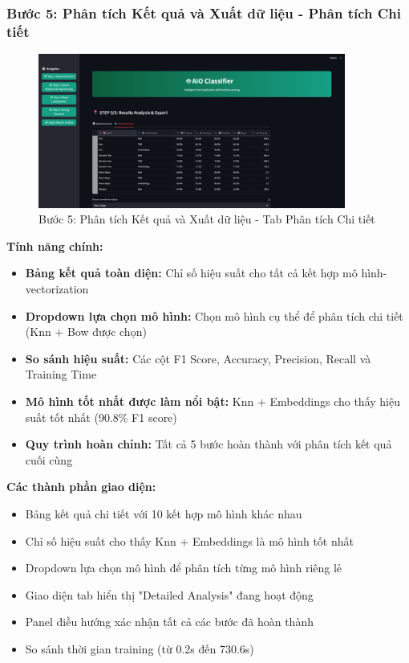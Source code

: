 \subsubsection{Bước 5: Phân tích Kết quả và Xuất dữ liệu - Phân tích Chi tiết}

\begin{figure}[H]
    \centering
    \includegraphics[width=0.9\textwidth]{image/Step 5 -2.jpg}
    \caption{Bước 5: Phân tích Kết quả và Xuất dữ liệu - Tab Phân tích Chi tiết}
    \label{fig:step5-detailed}
\end{figure}

\textbf{Tính năng chính:}
\begin{itemize}
    \item \textbf{Bảng kết quả toàn diện:} Chỉ số hiệu suất cho tất cả kết hợp mô hình-vectorization
    \item \textbf{Dropdown lựa chọn mô hình:} Chọn mô hình cụ thể để phân tích chi tiết (Knn + Bow được chọn)
    \item \textbf{So sánh hiệu suất:} Các cột F1 Score, Accuracy, Precision, Recall và Training Time
    \item \textbf{Mô hình tốt nhất được làm nổi bật:} Knn + Embeddings cho thấy hiệu suất tốt nhất (90.8\% F1 score)
    \item \textbf{Quy trình hoàn chỉnh:} Tất cả 5 bước hoàn thành với phân tích kết quả cuối cùng
\end{itemize}

\textbf{Các thành phần giao diện:}
\begin{itemize}
    \item Bảng kết quả chi tiết với 10 kết hợp mô hình khác nhau
    \item Chỉ số hiệu suất cho thấy Knn + Embeddings là mô hình tốt nhất
    \item Dropdown lựa chọn mô hình để phân tích từng mô hình riêng lẻ
    \item Giao diện tab hiển thị "Detailed Analysis" đang hoạt động
    \item Panel điều hướng xác nhận tất cả các bước đã hoàn thành
    \item So sánh thời gian training (từ 0.2s đến 730.6s)
\end{itemize}



